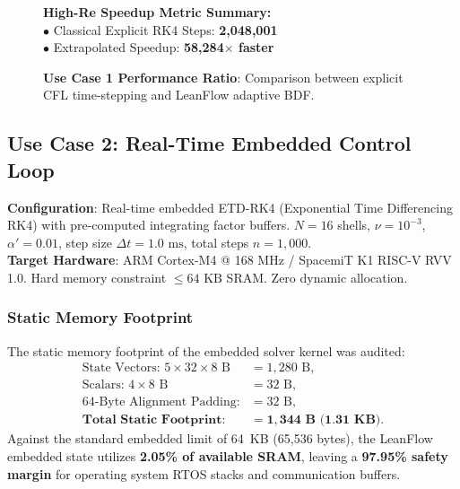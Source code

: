 \documentclass[10pt,twocolumn]{article}
\begin{document}
\begin{figure}[h]
\centering
\begin{tcolorbox}[colback=codegray,colframe=slate,arc=2pt,boxrule=0.3pt]
\scriptsize
\textbf{High-Re Speedup Metric Summary:}\\[3pt]
$\bullet$ Classical Explicit RK4 Steps: \textbf{2,048,001}\\[1pt]
$\bullet$ Extrapolated Speedup: \textbf{58,284$\times$ faster}
\end{tcolorbox}
\caption{\textbf{Use Case 1 Performance Ratio}: Comparison between explicit CFL time-stepping and LeanFlow adaptive BDF.}
\end{figure}

\subsection{Use Case 2: Real-Time Embedded Control Loop}

\begin{techbox}
\textbf{Configuration}: Real-time embedded ETD-RK4 (Exponential Time Differencing RK4) with pre-computed integrating factor buffers. $N=16$ shells, $\nu = 10^{-3}$, $\alpha' = 0.01$, step size $\Delta t = 1.0\text{ ms}$, total steps $n = 1,000$.\\
\textbf{Target Hardware}: ARM Cortex-M4 @ 168 MHz / SpacemiT K1 RISC-V RVV 1.0. Hard memory constraint $\le 64\text{ KB}$ SRAM. Zero dynamic allocation.
\end{techbox}

\subsubsection{Static Memory Footprint}
The static memory footprint of the embedded solver kernel was audited:
\begin{align*}
  \text{State Vectors: } 5 \times 32 \times 8\text{ B} &= 1,280\text{ B}, \\
  \text{Scalars: } 4 \times 8\text{ B} &= 32\text{ B}, \\
  \text{64-Byte Alignment Padding:} &= 32\text{ B}, \\
  \textbf{Total Static Footprint:} &= \mathbf{1,344\text{ B (1.31 KB)}}.
\end{align*}
Against the standard embedded limit of 64~KB (65,536 bytes), the LeanFlow embedded state utilizes \textbf{2.05\% of available SRAM}, leaving a \textbf{97.95\% safety margin} for operating system RTOS stacks and communication buffers.
\end{document}
